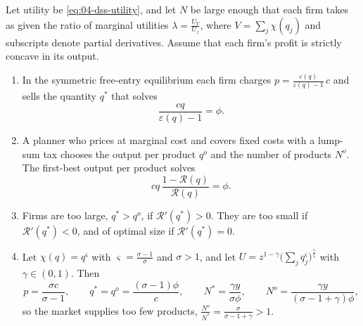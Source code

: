 \begin{proposition}\label{prop:04-dss}
Let utility be \eqref{eq:04-dss-utility}, and let $N$ be large enough that each firm takes as given the ratio of
marginal utilities $\lambda = \frac{U_V}{U_z}$, where $V = \sum_j\chi(q_j)$ and subscripts denote partial derivatives.
Assume that each firm's profit is strictly concave in its output.
\begin{enumerate}[label=(\roman*)]
\item In the symmetric free-entry equilibrium each firm charges $p = \frac{\varepsilon(q)}{\varepsilon(q) - 1}\,c$ and
sells the quantity $q^*$ that solves
\begin{equation}\label{eq:04-dss-market}
\frac{cq}{\varepsilon(q) - 1} = \phi .
\end{equation}
\item A planner who prices at marginal cost and covers fixed costs with a lump-sum tax chooses the output per product
$q^o$ and the number of products $N^o$. The first-best output per product solves
\begin{equation}\label{eq:04-dss-optimum}
cq\,\frac{1 - \mathcal{R}(q)}{\mathcal{R}(q)} = \phi .
\end{equation}
\item Firms are too large, $q^* > q^o$, if $\mathcal{R}'(q^*) > 0$. They are too small if $\mathcal{R}'(q^*) < 0$, and
of optimal size if $\mathcal{R}'(q^*) = 0$.
\item Let $\chi(q) = q^\varsigma$ with $\varsigma = \frac{\sigma - 1}{\sigma}$ and $\sigma > 1$, and let
$U = z^{1-\gamma}\big(\sum_jq_j^\varsigma\big)^{\frac{\gamma}{\varsigma}}$ with $\gamma \in (0,1)$. Then
\begin{equation}\label{eq:04-dss-ces}
p = \frac{\sigma c}{\sigma - 1}, \qquad q^* = q^o = \frac{(\sigma - 1)\phi}{c}, \qquad
N^* = \frac{\gamma y}{\sigma\phi}, \qquad N^o = \frac{\gamma y}{(\sigma - 1 + \gamma)\phi} ,
\end{equation}
so the market supplies too few products, $\frac{N^o}{N^*} = \frac{\sigma}{\sigma - 1 + \gamma} > 1$.
\end{enumerate}
\end{proposition}

